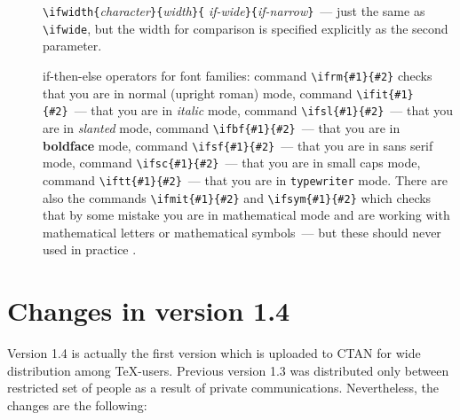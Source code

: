 \begin{description}
\item[] \verb?\ifwidth{?{\em character}\verb?}{?{\em width}\verb?}{?%
              {\em if-wide}\verb?}{?{\em if-narrow}\verb?}?~---
        just the same as \verb?\ifwide?, but the width for comparison
        is specified explicitly as the second parameter.

\item[] \textsf{if-then-else} operators for font families:
       command
       \verb?\ifrm{#1}{#2}? checks that you are in normal (upright roman) mode,
       command
       \verb?\ifit{#1}{#2}?~--- that you are in {\it italic} mode,
       command
       \verb?\ifsl{#1}{#2}?~--- that you are in {\sl slanted} mode,
       command
       \verb?\ifbf{#1}{#2}?~--- that you are in {\bf boldface} mode,
       command
       \verb?\ifsf{#1}{#2}?~--- that you are in {\sf sans serif} mode,
       command
       \verb?\ifsc{#1}{#2}?~--- that you are in {\sc small caps} mode,
       command
       \verb?\iftt{#1}{#2}?~--- that you are in {\tt typewriter} mode.
There are also the commands \verb?\ifmit{#1}{#2}? and \verb?\ifsym{#1}{#2}?
which checks that by some mistake you are in mathematical mode
and are working with mathematical letters or mathematical symbols~---
but these should never used in practice \hackersmile.

\end{description}

\section{Changes in version 1.4\label{S-new}}

Version 1.4 is actually the first version which is uploaded to CTAN
for wide distribution among \TeX-users. Previous version 1.3
was distributed only between restricted set of people as a result
of private communications. Nevertheless, the changes are
the following:

